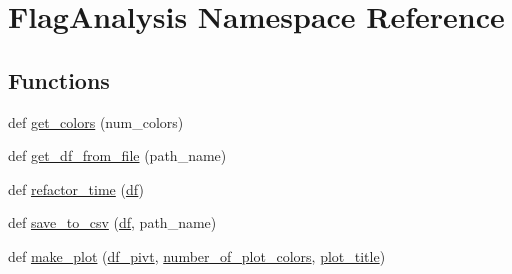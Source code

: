 \hypertarget{namespace_flag_analysis}{}\section{Flag\+Analysis Namespace Reference}
\label{namespace_flag_analysis}
\subsection*{Functions}
\begin{DoxyCompactItemize}
\item 
def \hyperlink{namespace_flag_analysis_a4ef4afc0d129e509db5b4e87e7f89520}{get\+\_\+colors} (num\+\_\+colors)
\item 
def \hyperlink{namespace_flag_analysis_aea67ad62c26ead387c02331695c812a1}{get\+\_\+df\+\_\+from\+\_\+file} (path\+\_\+name)
\item 
def \hyperlink{namespace_flag_analysis_a4b1d5d88a8955d1fdb0302a7c316c15c}{refactor\+\_\+time} (\hyperlink{namespace_flag_analysis_ae8822b0eb9daec5247dbcf50515f9809}{df})
\item 
def \hyperlink{namespace_flag_analysis_a3dd518fd2de056580053831b7cc0461c}{save\+\_\+to\+\_\+csv} (\hyperlink{namespace_flag_analysis_ae8822b0eb9daec5247dbcf50515f9809}{df}, path\+\_\+name)
\item 
def \hyperlink{namespace_flag_analysis_a9032e3f92b63876c3a38cc8f6a5e0d3f}{make\+\_\+plot} (\hyperlink{namespace_flag_analysis_a71e45af7a483a1647c8609f98d8b959e}{df\+\_\+pivt}, \hyperlink{namespace_flag_analysis_a2580a0126198e57e3b911e2e9005ce1e}{number\+\_\+of\+\_\+plot\+\_\+colors}, \hyperlink{namespace_flag_analysis_abd038dc9d4b0dae57d6f4ba4218b8f3a}{plot\+\_\+title})
\end{DoxyCompactItemize}
